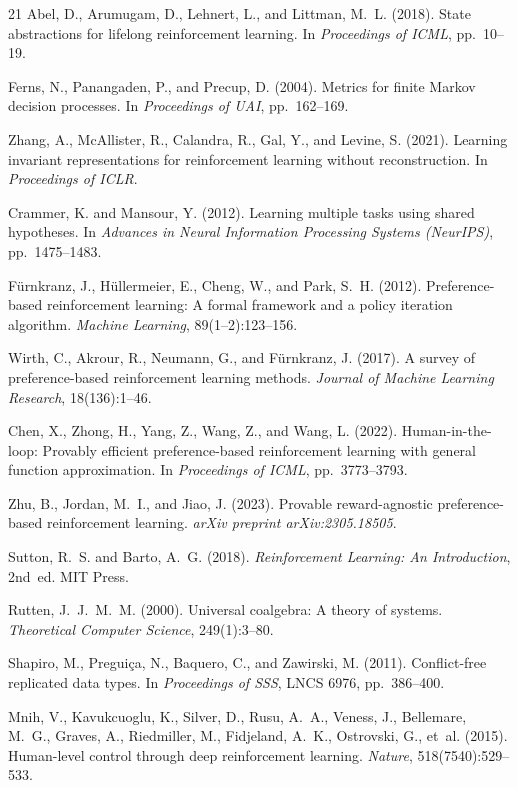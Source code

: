 \documentclass[9pt,a4paper]{article}
\theoremstyle{plain}
\theoremstyle{definition}
\theoremstyle{remark}
\begin{document}
\begin{thebibliography}{21}
Abel, D., Arumugam, D., Lehnert, L., and Littman, M.~L. (2018).
State abstractions for lifelong reinforcement learning.
In \textit{Proceedings of ICML}, pp.~10--19.

Ferns, N., Panangaden, P., and Precup, D. (2004).
Metrics for finite Markov decision processes.
In \textit{Proceedings of UAI}, pp.~162--169.

Zhang, A., McAllister, R., Calandra, R., Gal, Y., and Levine, S. (2021).
Learning invariant representations for reinforcement learning without reconstruction.
In \textit{Proceedings of ICLR}.

Crammer, K. and Mansour, Y. (2012).
Learning multiple tasks using shared hypotheses.
In \textit{Advances in Neural Information Processing Systems (NeurIPS)}, pp.~1475--1483.

F\"urnkranz, J., H\"ullermeier, E., Cheng, W., and Park, S.~H. (2012).
Preference-based reinforcement learning: A formal framework and a policy iteration algorithm.
\textit{Machine Learning}, 89(1--2):123--156.

Wirth, C., Akrour, R., Neumann, G., and F\"urnkranz, J. (2017).
A survey of preference-based reinforcement learning methods.
\textit{Journal of Machine Learning Research}, 18(136):1--46.

Chen, X., Zhong, H., Yang, Z., Wang, Z., and Wang, L. (2022).
Human-in-the-loop: Provably efficient preference-based reinforcement learning with general function approximation.
In \textit{Proceedings of ICML}, pp.~3773--3793.

Zhu, B., Jordan, M.~I., and Jiao, J. (2023).
Provable reward-agnostic preference-based reinforcement learning.
\textit{arXiv preprint arXiv:2305.18505}.

Sutton, R.~S. and Barto, A.~G. (2018).
\textit{Reinforcement Learning: An Introduction}, 2nd~ed. MIT Press.

Rutten, J.~J.~M.~M. (2000).
Universal coalgebra: A theory of systems.
\textit{Theoretical Computer Science}, 249(1):3--80.

Shapiro, M., Pregui\c{c}a, N., Baquero, C., and Zawirski, M. (2011).
Conflict-free replicated data types.
In \textit{Proceedings of SSS}, LNCS 6976, pp.~386--400.

Mnih, V., Kavukcuoglu, K., Silver, D., Rusu, A.~A., Veness, J., Bellemare, M.~G., Graves, A., Riedmiller, M., Fidjeland, A.~K., Ostrovski, G., et~al. (2015).
Human-level control through deep reinforcement learning.
\textit{Nature}, 518(7540):529--533.


\end{thebibliography}
\end{document}
